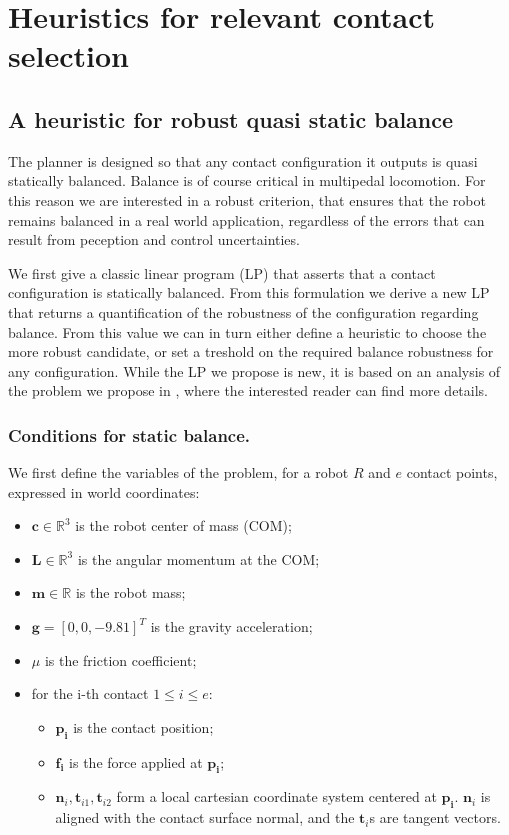 \section{Heuristics for relevant contact selection}

\subsection{A heuristic for robust quasi static balance}
The planner is designed so that any contact configuration it outputs is quasi statically balanced.
Balance is of course critical in multipedal locomotion. For this reason we are interested in a robust 
criterion, that ensures that the robot remains balanced in a real world application, regardless of the errors
that can result from peception and control uncertainties.

We first give a classic linear program (LP) that asserts that a contact configuration is statically balanced.
From this formulation we derive a new LP that returns a quantification of the robustness of the configuration regarding balance.
From this value we can in turn either define a heuristic to choose the more robust candidate, or set a treshold on the required balance robustness
for any configuration. While the LP we propose is new, it is based on an analysis of the problem we propose in \cite{Prete2016}, where the interested reader
can find more details.


\subsubsection{Conditions for static balance.}
We first define the variables of the problem, for a robot $R$ and $e$ contact points, expressed in world coordinates:
\begin{itemize}
\item $\mathbf{c} \in \mathbb{R}^3$ is the robot center of mass (COM);
\item $\mathbf{L}  \in \mathbb{R}^3 $ is the angular momentum at the COM;
\item $\mathbf{m} \in \mathbb{R}$ is the robot mass;
\item $\mathbf{g} = [0,0,-9.81]^T$ is the gravity acceleration;
\item $\mu$ is the friction coefficient;
\item for the i-th contact $1 \leq i \leq e$:
	\begin{itemize}
	\item $\mathbf{p_i}$ is the contact position;
	\item $\mathbf{f_i}$ is the force applied at $\mathbf{p_i}$;
	\item $\mathbf{n}_i,\mathbf{t}_{i1},\mathbf{t}_{i2}$ form a local cartesian coordinate system centered at $\mathbf{p_i}$. $\mathbf{n}_i$ is aligned
	with the contact surface normal, and the $\mathbf{t}_i$s are tangent vectors.
	\end{itemize}
\end{itemize}

